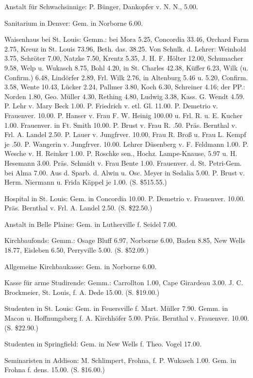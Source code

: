 Anstalt für Schwachsinnige: P. Bünger, Dankopfer v. N. N., 5.00.

Sanitarium in Denver: Gem. in Norborne 6.00.

Waisenhaus bei St. Louis: Gemm.: bei Mora 5.25, Concordia 33.46, Orchard Farm 2.75, Kreuz in St. Louis 73.96, Beth. das. 38.25. Von Schulk. d. Lehrer: Weinhold 3.75, Schröter 7.00, Natzke 7.50, Krentz 5.35, J. H. F. Hölter 12.00, Schumacher 9.58, Welp u. Wukasch 8.75, Bohl 4.20, in St. Charles 42.38, Küffer 6.23, Wilk (u. Confirm.) 6.48, Lindörfer 2.89, Frl. Wilk 2.76, in Altenburg 5.46 u. 5.20, Confirm. 3.58, Wente 10.43, Lücker 2.24, Pallmer 3.80, Koch 6.30, Schreiner 4.16; der PP.: Norden 1.80, Geo. Müller 4.30, Rething 4.80, Ludwig 3.38, Kass. G. Wendt 4.59. P. Lehr v. Mary Beck 1.00. P. Friedrich v. etl. Gl. 11.00. P. Demetrio v. Frauenver. 10.00. P. Hanser v. Frau F. W. Heinig 100.00 u. Frl. R. u. E. Kucher 1.00. Frauenver. in Ft. Smith 10.00. P. Brust v. Frau R. .50. Präs. Bernthal v. Frl. A. Landel 2.50. P. Lauer v. Jungfrver. 10.00, Frau R. Broß u. Frau L. Kempf je .50. P. Wangerin v. Jungfrver. 10.00. Lehrer Düsenberg v. F. Feldmann 1.00. P. Wesche v. H. Reinker 1.00. P. Roschke sen., Hochz. Lampe-Knause, 5.97 u. H. Hesemann 3.00. Präs. Schmidt v. Frau Bente 1.00. Frauenver. d. St. Petri-Gem. bei Alma 7.00. Aus d. Sparb. d. Alwin u. Osc. Meyer in Sedalia 5.00. P. Brust v. Herm. Niermann u. Frida Käppel je 1.00. (S. \$515.55.)

Hospital in St. Louis: Gem. in Concordia 10.00. P. Demetrio v. Frauenver. 10.00. Präs. Bernthal v. Frl. A. Landel 2.50. (S. \$22.50.)

Anstalt in Belle Plaine: Gem. in Lutherville f. Seidel 7.00.

Kirchbaufonds: Gemm.: Osage Bluff 6.97, Norborne 6.00, Baden 8.85, New Wells 18.77, Eisleben 6.50, Perryville 5.00. (S. \$52.09.)

Allgemeine Kirchbaukasse: Gem. in Norborne 6.00.

Kasse für arme Studirende: Gemm.: Carrollton 1.00, Cape Girardeau 3.00. J. C. Brockmeier, St. Louis, f. A. Dede 15.00. (S. \$19.00.)

Studenten in St. Louis: Gem. in Feuersville f. Mart. Müller 7.90. Gemm. in Macon u. Hoffnungsberg f. A. Kirchhöfer 5.00. Präs. Bernthal v. Frauenver. 10.00. (S. \$22.90.)

Studenten in Springfield: Gem. in New Wells f. Theo. Vogel 17.00.

Seminaristen in Addison: M. Schlimpert, Frohna, f. P. Wukasch 1.00. Gem. in Frohna f. dens. 15.00. (S. \$16.00.)

